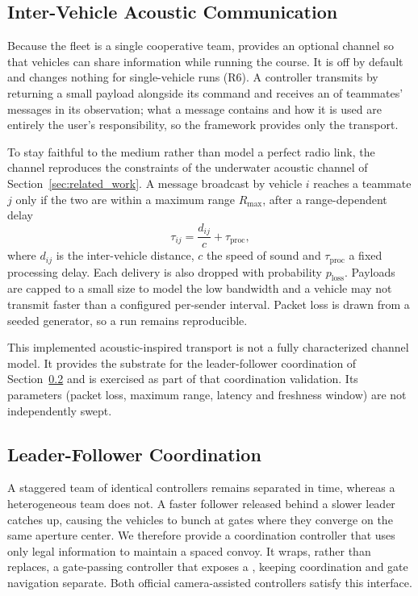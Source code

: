 \subsection{Inter-Vehicle Acoustic Communication}

Because the fleet is a single cooperative team, \mra{} provides an optional channel so that vehicles can share information while running the course. It is off by default and changes nothing for single-vehicle runs (R6). A controller transmits by returning a small  payload alongside its command and receives an  of teammates' messages in its observation; what a message contains and how it is used are entirely the user's responsibility, so the framework provides only the transport.

To stay faithful to the medium rather than model a perfect radio link, the channel reproduces the constraints of the underwater acoustic channel of Section~\ref{sec:related_work}. A message broadcast by vehicle $i$ reaches a teammate $j$ only if the two are within a maximum range $R_{\max}$, after a range-dependent delay
\begin{equation}
\label{eq:comms_latency}
\tau_{ij}=\frac{d_{ij}}{c}+\tau_{\mathrm{proc}},
\end{equation}
where $d_{ij}$ is the inter-vehicle distance, $c$ the speed of sound and $\tau_{\mathrm{proc}}$ a fixed processing delay. Each delivery is also dropped with probability $p_{\mathrm{loss}}$. Payloads are capped to a small size to model the low bandwidth and a vehicle may not transmit faster than a configured per-sender interval. Packet loss is drawn from a seeded generator, so a run remains reproducible.

This implemented acoustic-inspired transport is not a fully characterized channel model. It provides the substrate for the leader-follower coordination of Section~\ref{sec:coordination} and is exercised as part of that coordination validation. Its parameters (packet loss, maximum range, latency and freshness window) are not independently swept.

\subsection{Leader-Follower Coordination}
\label{sec:coordination}

A staggered team of identical controllers remains separated in time, whereas a heterogeneous team does not. A faster follower released behind a slower leader catches up, causing the vehicles to bunch at gates where they converge on the same aperture center. We therefore provide a coordination controller that uses only legal information to maintain a spaced convoy. It wraps, rather than replaces, a gate-passing controller that exposes a , keeping coordination and gate navigation separate. Both official camera-assisted controllers satisfy this interface.

